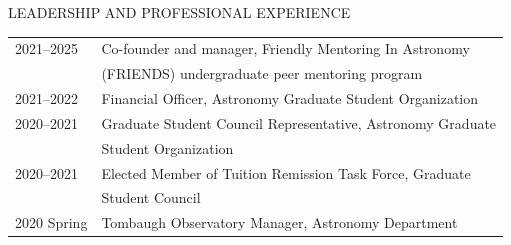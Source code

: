 \begin{center}
LEADERSHIP AND PROFESSIONAL EXPERIENCE
\end{center}
\begin{flushleft}
\begin{tabular}{ll}
2021--2025 & Co-founder and manager, Friendly Mentoring In Astronomy \\
           & (FRIENDS) undergraduate peer mentoring program \\
2021--2022 & Financial Officer, Astronomy Graduate Student Organization \\
2020--2021 & Graduate Student Council Representative, Astronomy Graduate \\
	   & Student Organization \\
2020--2021 & Elected Member of Tuition Remission Task Force, Graduate \\
           & Student Council \\
2020 Spring & Tombaugh Observatory Manager, Astronomy Department \\
\end{tabular}
\end{flushleft}
